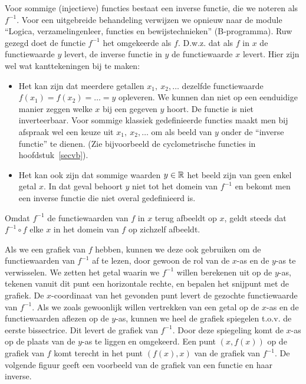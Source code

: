 \documentclass{ximera}
\begin{document}
Voor sommige (injectieve) functies bestaat een inverse functie, die we
noteren als $f^{-1}$. Voor een uitgebreide behandeling verwijzen we
opnieuw naar de module ``Logica, verzamelingenleer, functies en
bewijstechnieken'' (B-programma).  Ruw gezegd doet de functie $f^{-1}$
het omgekeerde als $f$. D.w.z. dat als $f$ in $x$ de functiewaarde $y$
levert, de inverse functie in $y$ de functiewaarde $x$ levert. Hier
zijn wel wat kanttekeningen bij te maken:
\begin{itemize}
\item Het kan zijn dat meerdere getallen $x_1,~x_2,\ldots$ dezelfde
  functiewaarde $f(x_1)=f(x_2)=\ldots=y$ opleveren. We kunnen dan niet
  op een eenduidige manier zeggen welke $x$ bij een gegeven $y$
  hoort. De functie is niet inverteerbaar. Voor sommige klassiek
  gedefinieerde functies maakt men bij afspraak wel een keuze uit
  $x_1,~x_2,\ldots$ om als beeld van $y$ onder de ``inverse functie''
  te dienen. (Zie bijvoorbeeld de cyclometrische functies in
  hoofdstuk~\ref{secvb}).
\item Het kan ook zijn dat sommige waarden $y\in\mathbb{R}$ het beeld zijn van
  geen enkel getal $x$. In dat geval behoort $y$ niet tot het domein
  van $f^{-1}$ en bekomt men een inverse functie die niet overal
  gedefinieerd is.
\end{itemize}
Omdat $f^{-1}$ de functiewaarden van $f$ in $x$ terug afbeeldt op $x$,
geldt steeds dat $f^{-1}\circ f$ elke $x$ in het domein van $f$ op
zichzelf afbeeldt.

Als we een grafiek van $f$ hebben, kunnen we deze ook gebruiken om de
functiewaarden van $f^{-1}$ af te lezen, door gewoon de rol van de
$x$-as en de $y$-as te verwisselen. We zetten het getal waarin we
$f^{-1}$ willen berekenen uit op de $y$-as, tekenen vanuit dit punt
een horizontale rechte, en bepalen het snijpunt met de grafiek.  De
$x$-coordinaat van het gevonden punt levert de gezochte functiewaarde
van $f^{-1}$. Als we zoals gewoonlijk willen vertrekken van een
getal op de $x$-as en de functiewaarden aflezen op de $y$-as, kunnen we
heel de grafiek spiegelen t.o.v. de eerste bissectrice. Dit levert de
grafiek van $f^{-1}$. Door deze spiegeling komt de $x$-as op de plaats
van de $y$-as te liggen en omgekeerd. Een punt $(x,f(x))$ op de
grafiek van $f$ komt terecht in het punt $(f(x),x)$ van de grafiek van
$f^{-1}$.
De volgende figuur geeft een voorbeeld van de grafiek van een functie
en haar inverse.
\end{document}
